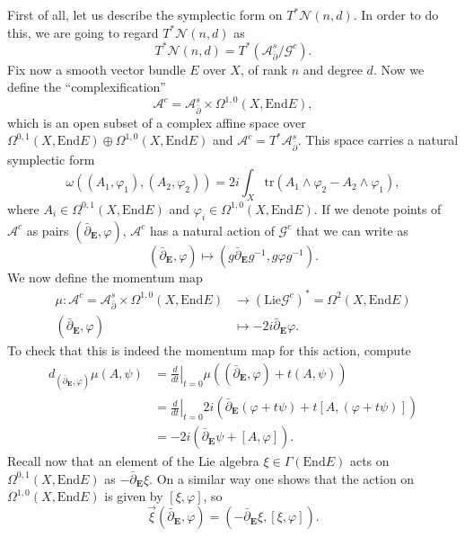 \documentclass[12pt,a4paper]{book}
\theoremstyle{definition} \newtheorem{defn}[thm]{Definition}
\theoremstyle{definition} \newtheorem{ejemplo}[thm]{Example}
\theoremstyle{remark} \newtheorem{rem}[thm]{Remark}
\def\AA{\mathscr{A}}
\def\GG{\mathscr{G}}
\def\tr{\mathrm{tr}}
\def\Lie{\mathrm{Lie}}
\def\End{\mathrm{End}}
\def\Bun{\mathscr{N}}
\def\delbar{\bar{\partial}}
\newcommand{\ve}[1]{\mathbf{#1}}
\begin{document}
First of all, let us describe the symplectic form on $T^*\Bun(n,d)$. In order to do this, we are going to regard $T^*\Bun(n,d)$ as
\begin{equation*}
  T^*\Bun(n,d)=T^*(\AA^s_{\delbar}/\GG^c).
\end{equation*}
Fix now a smooth vector bundle $E$ over $X$, of rank $n$ and degree $d$. Now we define the ``complexification''
\begin{equation*}
  \AA^c=\AA^s_{\delbar}\times \Omega^{1,0}(X,\End E),
\end{equation*}
which is an open subset of a complex affine space over $\Omega^{0,1}(X,\End E) \oplus \Omega^{1,0}(X,\End E)$ and $\AA^c=T^*\AA^s_{\delbar}$. This space carries a natural symplectic form 
\begin{equation*}
  \omega\left( (A_1,\varphi_1),(A_2,\varphi_2) \right)=2i\int_X \tr(A_1 \wedge \varphi_2-A_2\wedge \varphi_1),
\end{equation*}
where $A_i \in \Omega^{0,1}(X,\End E)$ and $\varphi_i \in \Omega^{1,0}(X,\End E)$. If we denote points of $\AA^c$ as pairs $(\delbar_{\ve{E}},\varphi)$, $\AA^c$ has a natural action of $\GG^c$ that we can write as
\begin{equation*}
  (\delbar_{\ve{E}},\varphi) \mapsto (g\delbar_{\ve{E}}g^{-1},g\varphi g^{-1}).
\end{equation*}
We now define the momentum map
\begin{align*}
  \mu :\AA^c=\AA^s_{\delbar}\times \Omega^{1,0}(X,\End E)&\longrightarrow (\Lie\GG^c)^*=\Omega^2(X,\End E) \\
  (\delbar_{\ve{E}},\varphi) &\longmapsto- 2i\delbar_{\ve{E}}\varphi.
  \end{align*}
  To check that this is indeed the momentum map for this action, compute
  \begin{align*}
    d_{(\delbar_{\ve{E}},\varphi)}\mu(A,\psi)&=\left.\frac{d}{dt}\right|_{t=0} \mu\left( (\delbar_{\ve{E}},\varphi)+t(A,\psi) \right)\\ &=\left.\frac{d}{dt}\right|_{t=0} 2i(\delbar_{\ve{E}}(\varphi+t\psi)+t[A, (\varphi+t\psi)]) \\
    &=- 2i(\delbar_{\ve{E}} \psi + [A,\varphi]).
  \end{align*}
  Recall now that an element of the Lie algebra $\xi\in\Gamma(\End E)$ acts on $\Omega^{0,1}(X, \End E)$ as $-\delbar_{\ve{E}} \xi$. On a similar way one shows that the action on $\Omega^{1,0}(X,\End E)$ is given by $[\xi,\varphi]$, so 
  \begin{equation*}
    \vec{\xi}(\delbar_{\ve{E}},\varphi)=(-\delbar_{\ve{E}}\xi, [\xi,\varphi]).
  \end{equation*}
\end{document}
